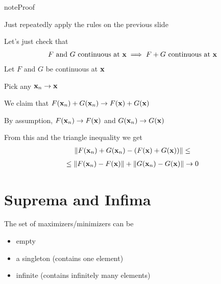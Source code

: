 \documentclass[letterpaper,10pt,english]{jupyterBook}
\begin{document}
\begin{sphinxadmonition}{note}{Proof}

\sphinxAtStartPar
Just repeatedly apply the rules on the previous slide

\sphinxAtStartPar
Let’s just check that
\begin{equation*}
\begin{split}
%
\text{$F$ and $G$ continuous at ${\bf x}$}
\implies 
\text{$F + G$ continuous at ${\bf x}$}
%
\end{split}
\end{equation*}
\sphinxAtStartPar
Let \(F\) and \(G\) be continuous at \({\bf x}\)

\sphinxAtStartPar
Pick any \({\bf x}_n \to {\bf x}\)

\sphinxAtStartPar
We claim that
\(F({\bf x}_n) + G({\bf x}_n) \to F({\bf x}) + G({\bf x})\)

\sphinxAtStartPar
By assumption, \(F({\bf x}_n) \to F({\bf x})\) and \(G({\bf x}_n) \to G({\bf x})\)

\sphinxAtStartPar
From this and the triangle inequality we get
\begin{equation*}
\begin{split}
%
\| F({\bf x}_n) + G({\bf x}_n) - (F({\bf x}) + G({\bf x})) \|
\leq 
%
\end{split}
\end{equation*}\begin{equation*}
\begin{split}
%
\leq 
\| F({\bf x}_n) - F({\bf x}) \|
+
\| G({\bf x}_n) - G({\bf x}) \|
\to 0
%
\end{split}
\end{equation*}\end{sphinxadmonition}


\section{Suprema and Infima}
\label{\detokenize{06.optimization_fundamentals:suprema-and-infima}}
\sphinxAtStartPar
The set of maximizers/minimizers can be
\begin{itemize}
\item {} 
\sphinxAtStartPar
empty

\item {} 
\sphinxAtStartPar
a singleton (contains one element)

\item {} 
\sphinxAtStartPar
infinite (contains infinitely many elements)

\end{itemize}
\end{document}
